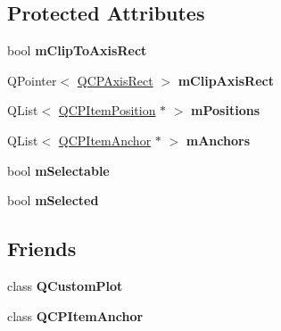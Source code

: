 \subsection*{Protected Attributes}
\begin{DoxyCompactItemize}
\item 
bool {\bfseries m\+Clip\+To\+Axis\+Rect}\hypertarget{class_q_c_p_abstract_item_ad2a70ff6b658fcb84a9427f69d3f587d}{}\label{class_q_c_p_abstract_item_ad2a70ff6b658fcb84a9427f69d3f587d}

\item 
Q\+Pointer$<$ \hyperlink{class_q_c_p_axis_rect}{Q\+C\+P\+Axis\+Rect} $>$ {\bfseries m\+Clip\+Axis\+Rect}\hypertarget{class_q_c_p_abstract_item_a3e57cfe7da4b1ac3d6fa7281ea437361}{}\label{class_q_c_p_abstract_item_a3e57cfe7da4b1ac3d6fa7281ea437361}

\item 
Q\+List$<$ \hyperlink{class_q_c_p_item_position}{Q\+C\+P\+Item\+Position} $\ast$ $>$ {\bfseries m\+Positions}\hypertarget{class_q_c_p_abstract_item_af94ff71b6a15ea6d028ab8bd8eccd012}{}\label{class_q_c_p_abstract_item_af94ff71b6a15ea6d028ab8bd8eccd012}

\item 
Q\+List$<$ \hyperlink{class_q_c_p_item_anchor}{Q\+C\+P\+Item\+Anchor} $\ast$ $>$ {\bfseries m\+Anchors}\hypertarget{class_q_c_p_abstract_item_a909a3abab783de302ebf0a0e6f2bbc15}{}\label{class_q_c_p_abstract_item_a909a3abab783de302ebf0a0e6f2bbc15}

\item 
bool {\bfseries m\+Selectable}\hypertarget{class_q_c_p_abstract_item_ad81eb35c8726a0f458db9df9732e0e41}{}\label{class_q_c_p_abstract_item_ad81eb35c8726a0f458db9df9732e0e41}

\item 
bool {\bfseries m\+Selected}\hypertarget{class_q_c_p_abstract_item_a4bdb3457dad1d268c0f78a44152b9645}{}\label{class_q_c_p_abstract_item_a4bdb3457dad1d268c0f78a44152b9645}

\end{DoxyCompactItemize}
\subsection*{Friends}
\begin{DoxyCompactItemize}
\item 
class {\bfseries Q\+Custom\+Plot}\hypertarget{class_q_c_p_abstract_item_a1cdf9df76adcfae45261690aa0ca2198}{}\label{class_q_c_p_abstract_item_a1cdf9df76adcfae45261690aa0ca2198}

\item 
class {\bfseries Q\+C\+P\+Item\+Anchor}\hypertarget{class_q_c_p_abstract_item_a61767d414fd57af9eb1741b34268c7fc}{}\label{class_q_c_p_abstract_item_a61767d414fd57af9eb1741b34268c7fc}

\end{DoxyCompactItemize}


